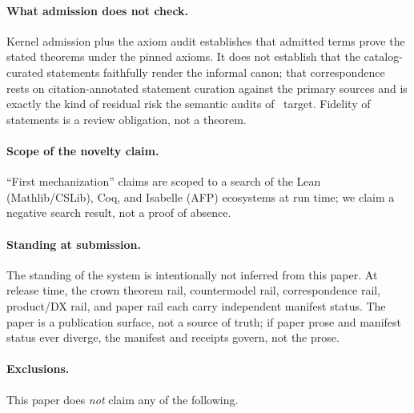 \documentclass[11pt]{article}
\begin{document}
\paragraph{What admission does not check.}
Kernel admission plus the axiom audit establishes that admitted terms prove
the stated theorems under the pinned axioms. It does not establish that
the catalog-curated statements faithfully render the informal canon; that
correspondence rests on citation-annotated statement curation against the
primary sources and is exactly the kind of residual risk the semantic
audits of~\cite{meek2026formalizing} target. Fidelity of statements is a
review obligation, not a theorem.

\paragraph{Scope of the novelty claim.}
``First mechanization'' claims are scoped to a search of the Lean
(Mathlib/CSLib), Coq, and Isabelle (AFP) ecosystems at run time; we claim a
negative search result, not a proof of absence.

\paragraph{Standing at submission.}
The standing of the system is intentionally not inferred from this paper.
At release time, the crown theorem rail, countermodel rail, correspondence
rail, product/DX rail, and paper rail each carry independent manifest
status. The paper is a publication surface, not a source of truth; if
paper prose and manifest status ever diverge, the manifest and receipts
govern, not the prose.

\paragraph{Exclusions.}
This paper does \emph{not} claim any of the following.
\end{document}
